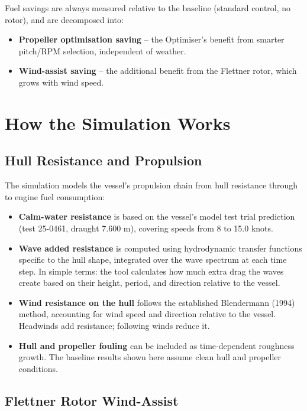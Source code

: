 \documentclass[a4paper,11pt]{article}
\begin{document}
Fuel savings are always measured relative to the baseline (standard control, no
rotor), and are decomposed into:
\begin{itemize}
\item \textbf{Propeller optimisation saving} -- the Optimiser's benefit from smarter pitch/RPM selection, independent of weather.
\item \textbf{Wind-assist saving} -- the additional benefit from the Flettner rotor, which grows with wind speed.
\end{itemize}

\section{How the Simulation Works}
\label{sec:org44adcc0}
\subsection{Hull Resistance and Propulsion}
\label{sec:org03fd726}

The simulation models the vessel's propulsion chain from hull resistance through
to engine fuel consumption:

\begin{itemize}
\item \textbf{Calm-water resistance} is based on the vessel's model test trial prediction
(test 25-0461, draught 7.600 m), covering speeds from 8 to 15.0 knots.
\item \textbf{Wave added resistance} is computed using hydrodynamic transfer functions
specific to the hull shape, integrated over the wave spectrum at each time
step.  In simple terms: the tool calculates how much extra drag the waves
create based on their height, period, and direction relative to the vessel.
\item \textbf{Wind resistance on the hull} follows the established Blendermann (1994)
method, accounting for wind speed and direction relative to the vessel.
Headwinds add resistance; following winds reduce it.
\item \textbf{Hull and propeller fouling} can be included as time-dependent roughness
growth.  The baseline results shown here assume clean hull and propeller
conditions.
\end{itemize}

\subsection{Flettner Rotor Wind-Assist}
\label{sec:org07d2b50}
\end{document}
